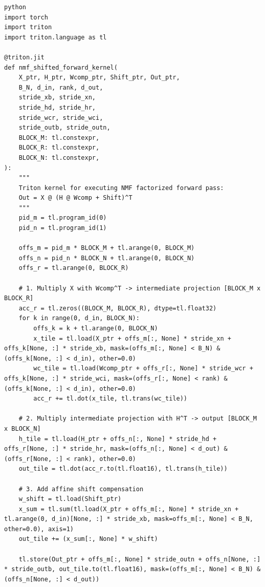 \vspace{0.5em}
\begin{mdframed}[backgroundcolor=codebg, linecolor=codeframe, linewidth=1pt, roundcorner=4pt, innerleftmargin=2pt, innerrightmargin=5pt, innertopmargin=5pt, innerbottommargin=5pt]
\begin{lstlisting}
python
import torch
import triton
import triton.language as tl

@triton.jit
def nmf_shifted_forward_kernel(
    X_ptr, H_ptr, Wcomp_ptr, Shift_ptr, Out_ptr,
    B_N, d_in, rank, d_out,
    stride_xb, stride_xn,
    stride_hd, stride_hr,
    stride_wcr, stride_wci,
    stride_outb, stride_outn,
    BLOCK_M: tl.constexpr,
    BLOCK_R: tl.constexpr,
    BLOCK_N: tl.constexpr,
):
    """
    Triton kernel for executing NMF factorized forward pass:
    Out = X @ (H @ Wcomp + Shift)^T
    """
    pid_m = tl.program_id(0)
    pid_n = tl.program_id(1)

    offs_m = pid_m * BLOCK_M + tl.arange(0, BLOCK_M)
    offs_n = pid_n * BLOCK_N + tl.arange(0, BLOCK_N)
    offs_r = tl.arange(0, BLOCK_R)

    # 1. Multiply X with Wcomp^T -> intermediate projection [BLOCK_M x BLOCK_R]
    acc_r = tl.zeros((BLOCK_M, BLOCK_R), dtype=tl.float32)
    for k in range(0, d_in, BLOCK_N):
        offs_k = k + tl.arange(0, BLOCK_N)
        x_tile = tl.load(X_ptr + offs_m[:, None] * stride_xn + offs_k[None, :] * stride_xb, mask=(offs_m[:, None] < B_N) & (offs_k[None, :] < d_in), other=0.0)
        wc_tile = tl.load(Wcomp_ptr + offs_r[:, None] * stride_wcr + offs_k[None, :] * stride_wci, mask=(offs_r[:, None] < rank) & (offs_k[None, :] < d_in), other=0.0)
        acc_r += tl.dot(x_tile, tl.trans(wc_tile))

    # 2. Multiply intermediate projection with H^T -> output [BLOCK_M x BLOCK_N]
    h_tile = tl.load(H_ptr + offs_n[:, None] * stride_hd + offs_r[None, :] * stride_hr, mask=(offs_n[:, None] < d_out) & (offs_r[None, :] < rank), other=0.0)
    out_tile = tl.dot(acc_r.to(tl.float16), tl.trans(h_tile))

    # 3. Add affine shift compensation
    w_shift = tl.load(Shift_ptr)
    x_sum = tl.sum(tl.load(X_ptr + offs_m[:, None] * stride_xn + tl.arange(0, d_in)[None, :] * stride_xb, mask=offs_m[:, None] < B_N, other=0.0), axis=1)
    out_tile += (x_sum[:, None] * w_shift)

    tl.store(Out_ptr + offs_m[:, None] * stride_outn + offs_n[None, :] * stride_outb, out_tile.to(tl.float16), mask=(offs_m[:, None] < B_N) & (offs_n[None, :] < d_out))
\end{lstlisting}
\end{mdframed}
\vspace{0.5em}


